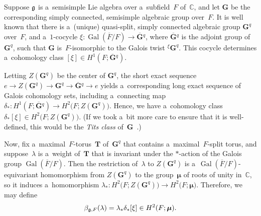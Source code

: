 \documentclass[10pt,a4paper]{amsart}
\DeclareMathOperator{\Gal}{Gal}
\numberwithin{equation}{section}
\newcommand{\Lie}[1]{\mathfrak{\lowercase{#1}}}
\begin{document}
\begin{defn} \label{BetaDefn}
Suppose $\Lie G$ is a~semisimple Lie algebra over a~subf\/ield~$F$ of~$\mathbb{C}$, and let $\mathbf{G}$ be the
corresponding simply connected, semisimple algebraic group over~$F$.
It is well known that there is a~(unique) quasi-split, simply connected algebraic group $\mathbf{G}^q$ over~$F$, and
a~$1$-cocycle $\xi \colon \Gal(\overline{F}/F) \to \overline{\mathbf{G}}{}^q$, where $\overline{\mathbf{G}}{}^q$ is the
adjoint group of~$\mathbf{G}^q$, such that $\mathbf{G}$ is~$F$-isomorphic to the Galois twist ${}^\xi \mathbf{G}^q$.
This cocycle determines a~cohomology class $[\xi] \in H^1(F; \overline{\mathbf{G}}{}^q)$.

Letting $Z(\mathbf{G}^q)$ be the center of $\mathbf{G}^q$, the short exact sequence $ e \to Z(\mathbf{G}^q) \to
\mathbf{G}^q \to \overline{\mathbf{G}}{}^q \to e $ yields a~corresponding long exact sequence of Galois cohomology sets,
including a~connecting map $\delta_* \colon H^1(F; \overline{\mathbf{G}}{}^q) \to H^2\bigl(F; Z(\mathbf{G}^q) \bigr)$.
Hence, we have a~cohomology class $\delta_* [\xi] \in H^2\bigl(F; Z(\mathbf{G}^q) \bigr)$.
(If we took a~bit more care to ensure that it is well-def\/ined, this would be the \emph{Tits class}
of~$\mathbf{G}$~\cite[p.~426]{KnusEtAl-BookOfInvols}.)

Now, f\/ix a~maximal~$F$-torus~$\mathbf{T}$ of~$\mathbf{G}^q$ that contains a~maximal~$F$-split torus, and
suppose~$\lambda$ is a~weight of~$\mathbf{T}$ that is invariant under the $*$-action of the Galois group $\Gal(\overline{F}/F)$.
Then the restriction of~$\lambda$ to $Z(\mathbf{G}^q)$ is a~$\Gal(\overline{F}/F)$-equivariant homomorphism from
$Z(\mathbf{G}^q)$ to the group~$\boldsymbol\mu$ of roots of unity in~$\mathbb{C}$, so it induces a~homomorphism
$\lambda_* \colon H^2\bigl(F; Z(\mathbf{G}^q) \bigr) \to H^2\bigl(F; \boldsymbol\mu \bigr)$.
Therefore, we may def\/ine
\begin{gather*}
\beta_{\Lie G,F}(\lambda) = \lambda_* \delta_* [\xi] \in H^2(F; \boldsymbol\mu).
\end{gather*}
\end{defn}
\end{document}
